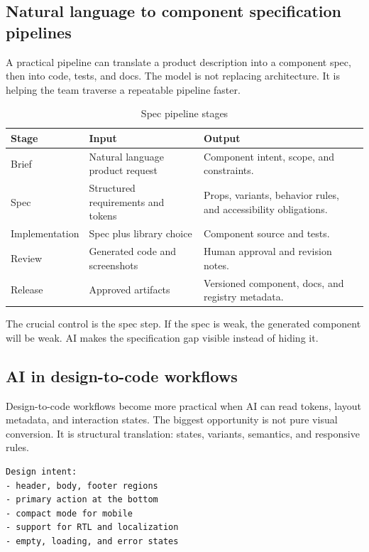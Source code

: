 \subsection{Natural language to component specification pipelines}
A practical pipeline can translate a product description into a component spec, then into code, tests, and docs. The model is not replacing architecture. It is helping the team traverse a repeatable pipeline faster.

\begin{table}[htbp]
  \centering
  \caption{Spec pipeline stages}
  \begin{tabularx}{\textwidth}{@{}p{}p{}Y@{}}
    \toprule
    \textbf{Stage} & \textbf{Input} & \textbf{Output} \\
    \midrule
    Brief & Natural language product request & Component intent, scope, and constraints. \\
    Spec & Structured requirements and tokens & Props, variants, behavior rules, and accessibility obligations. \\
    Implementation & Spec plus library choice & Component source and tests. \\
    Review & Generated code and screenshots & Human approval and revision notes. \\
    Release & Approved artifacts & Versioned component, docs, and registry metadata. \\
    \bottomrule
  \end{tabularx}
\end{table}

The crucial control is the spec step. If the spec is weak, the generated component will be weak. AI makes the specification gap visible instead of hiding it.

\subsection{AI in design-to-code workflows}
Design-to-code workflows become more practical when AI can read tokens, layout metadata, and interaction states. The biggest opportunity is not pure visual conversion. It is structural translation: states, variants, semantics, and responsive rules.

\begin{verbatim}
Design intent:
- header, body, footer regions
- primary action at the bottom
- compact mode for mobile
- support for RTL and localization
- empty, loading, and error states
\end{verbatim}

